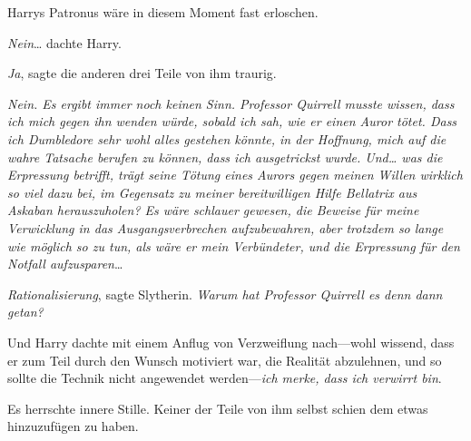 Harrys Patronus wäre in diesem Moment fast erloschen.

\emph{Nein}… dachte Harry.

\emph{Ja}, sagte die anderen drei Teile von ihm traurig.

\emph{Nein. Es ergibt immer noch keinen Sinn. Professor Quirrell musste wissen, dass ich mich gegen ihn wenden würde, sobald ich sah, wie er einen Auror tötet. Dass ich Dumbledore sehr wohl alles gestehen könnte, in der Hoffnung, mich auf die wahre Tatsache berufen zu können, dass ich ausgetrickst wurde. Und… was die Erpressung betrifft, trägt seine Tötung eines Aurors gegen meinen Willen wirklich so viel dazu bei, im Gegensatz zu meiner bereitwilligen Hilfe Bellatrix aus Askaban herauszuholen? Es wäre schlauer gewesen, die Beweise für meine Verwicklung in das Ausgangsverbrechen aufzubewahren, aber trotzdem so lange wie möglich so zu tun, als wäre er mein Verbündeter, und die Erpressung für den Notfall aufzusparen}…

\emph{Rationalisierung}, sagte Slytherin. \emph{Warum hat Professor Quirrell es denn dann getan?}

Und Harry dachte mit einem Anflug von Verzweiflung nach—wohl wissend, dass er zum Teil durch den Wunsch motiviert war, die Realität abzulehnen, und so sollte die Technik nicht angewendet werden—\emph{ich merke, dass ich verwirrt bin}.

Es herrschte innere Stille. Keiner der Teile von ihm selbst schien dem etwas hinzuzufügen zu haben.

